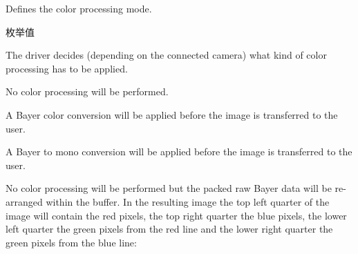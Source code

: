 Defines the color processing mode. 

\begin{Desc}
\item[枚举值]\par
\begin{description}
\item[{\em 
\hypertarget{group___common_interface_gga906258e7f7e29527fd5edf23f03a7adba45fbbe6abe8bc8f3c88a35efacf7e48d}{cpm\+Auto}\label{group___common_interface_gga906258e7f7e29527fd5edf23f03a7adba45fbbe6abe8bc8f3c88a35efacf7e48d}
}]The driver decides (depending on the connected camera) what kind of color processing has to be applied. \item[{\em 
\hypertarget{group___common_interface_gga906258e7f7e29527fd5edf23f03a7adba22bbace5659f675120304fd36163c255}{cpm\+Raw}\label{group___common_interface_gga906258e7f7e29527fd5edf23f03a7adba22bbace5659f675120304fd36163c255}
}]No color processing will be performed. \item[{\em 
\hypertarget{group___common_interface_gga906258e7f7e29527fd5edf23f03a7adba5147a69ec508aaf2fdb11f88a3f156b2}{cpm\+Bayer}\label{group___common_interface_gga906258e7f7e29527fd5edf23f03a7adba5147a69ec508aaf2fdb11f88a3f156b2}
}]A Bayer color conversion will be applied before the image is transferred to the user. \item[{\em 
\hypertarget{group___common_interface_gga906258e7f7e29527fd5edf23f03a7adba49d4edf481ad99f0b6df4d327640332c}{cpm\+Bayer\+To\+Mono}\label{group___common_interface_gga906258e7f7e29527fd5edf23f03a7adba49d4edf481ad99f0b6df4d327640332c}
}]A Bayer to mono conversion will be applied before the image is transferred to the user. \item[{\em 
\hypertarget{group___common_interface_gga906258e7f7e29527fd5edf23f03a7adbaf5deb69ef297ca1e04bce316aa2c1e43}{cpm\+Raw\+To\+Planes}\label{group___common_interface_gga906258e7f7e29527fd5edf23f03a7adbaf5deb69ef297ca1e04bce316aa2c1e43}
}]No color processing will be performed but the packed raw Bayer data will be re-\/arranged within the buffer. In the resulting image the top left quarter of the image will contain the red pixels, the top right quarter the blue pixels, the lower left quarter the green pixels from the red line and the lower right quarter the green pixels from the blue line\+:


\end{description}
\end{Desc}

